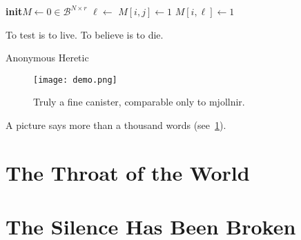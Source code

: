 \documentclass[a4paper, 11pt]{../smart-thesis}
\begin{document}
\begin{algorithm}
	\small
	\begin{shaded}
		\begin{algorithmic}[1]
			\newcommand*{\To}{\textbf{to}\xspace}
			\newcommand*{\Init}{\State\textbf{init}\xspace}
			\newcommand*{\B}{\mathcal{B}}
			\Init \(M \gets 0 \in \B^{N \times r}\) 
			\For{ \(i \gets 1\) \To N}
			\For{ \(j \gets r - r_1 + 1\) \To \(r\)}
			\State \(\ell \gets \)  
			\State \({M}[i, j] \gets 1\)
			\Else
			\State \({M}[i, \ell] \gets 1\)
			\EndIf
			\EndFor
			\EndFor
		\end{algorithmic}
	\end{shaded}
	\caption[Uncorrelated random data generation]{%
		Algorithm for the generation of a block $M$ of $N$ uncorrelated random
		vectors of length $r$, containing exactly $r_1$ ones.}%
	\label{alg:binam_random_data}
\end{algorithm}

\epigraph{To test is to live. To believe is to die.}{Anonymous Heretic}
\blindtext

\begin{figure}
	\centering
	\texttt{[image: demo.png]}
	\caption{Truly a fine canister, comparable only to \gls{mjollnir}.}%
	\label{fig:canister}
\end{figure}

\Blindtext\Blindtext

A picture says more than a thousand words (see~\ref{fig:canister}).

\section{The Throat of the World}

\blindtext


\section{The Silence Has Been Broken}

\blindtext

\end{document}
